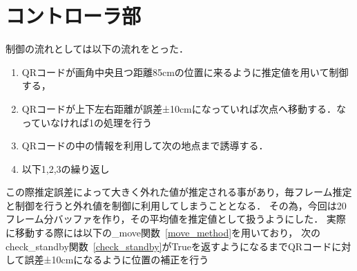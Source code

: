 \section{コントローラ部}
\label{implement_controller}
制御の流れとしては以下の流れをとった．

\begin{enumerate}
    \item QRコードが画角中央且つ距離85cmの位置に来るように推定値を用いて制御する，
    \item QRコードが上下左右距離が誤差±10cmになっていれば次点へ移動する．なっていなければ1の処理を行う
    \item QRコードの中の情報を利用して次の地点まで誘導する．
    \item 以下1,2,3の繰り返し
\end{enumerate}

この際推定誤差によって大きく外れた値が推定される事があり，毎フレーム推定と制御を行うと外れ値を制御に利用してしまうこととなる．
その為，今回は20フレーム分バッファを作り，その平均値を推定値として扱うようにした．
実際に移動する際には以下の\_move関数~\ref{move_method}を用いており，
次のcheck\_standby関数~\ref{check_standby}がTrueを返すようになるまでQRコードに対して誤差±10cmになるように位置の補正を行う

